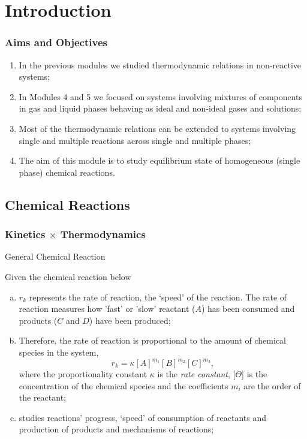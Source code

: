 \documentclass[10pt,compress,unknownkeysallowed]{beamer}
\begin{document}
\section{Introduction}

\begin{frame}
 \frametitle{Aims and Objectives}
   \begin{enumerate}
     \item<1-> In the previous modules we studied thermodynamic relations in non-reactive systems;
     \item<1-> In Modules 4 and 5 we focused on systems involving mixtures of components in gas and liquid phases behaving as ideal and non-ideal gases and solutions;
     \item<2-> Most of the thermodynamic relations can be extended to systems involving single and multiple reactions across single and multiple phases;
     \item<2-> The aim of this module is to study equilibrium state of homogeneous (\ie single phase) chemical reactions.
   \end{enumerate}
\end{frame}


\subsection{Chemical Reactions}

\begin{frame}
  \frametitle{Kinetics $\times$ Thermodynamics}

  \begin{block}{\begin{center}General Chemical Reaction\end{center}}
     Given the chemical reaction below
  \end{block}  

   \begin{enumerate}[a)]
       \item<1-> $r_{k}$ represents the rate of reaction, \ie the `speed' of the reaction. The rate of reaction measures how 'fast' or 'slow' reactant ($A$) has been consumed and products ($C$ and $D$) have been produced;
       \item<1-> Therefore, the rate of reaction is proportional to the amount of chemical species in the system, \eg
             \begin{displaymath}
                  r_{k} = \kappa [A]^{m_{1}}[B]^{m_{2}}[C]^{m_{3}},
             \end{displaymath}
             where the proportionality constant $\kappa$ is the {\it rate constant}, [$\Theta$] is the concentration of the chemical species and the coefficients $m_{i}$ are the order of the reactant;
       \item<1->  studies reactions' progress, \ie `speed' of consumption of reactants and production of products and mechanisms of reactions;
   \end{enumerate}
\end{frame}
\normalsize
\end{document}
